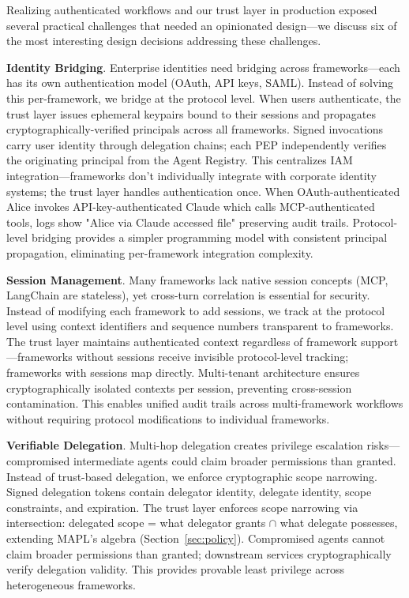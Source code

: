 Realizing authenticated workflows and our trust layer in production exposed several practical challenges that needed an opinionated design—we discuss six of the most interesting design decisions addressing these challenges.

\textbf{Identity Bridging}. Enterprise identities need bridging across frameworks—each has its own authentication model (OAuth, API keys, SAML). Instead of solving this per-framework, we bridge at the protocol level. When users authenticate, the trust layer issues ephemeral keypairs bound to their sessions and propagates cryptographically-verified principals across all frameworks. Signed invocations carry user identity through delegation chains; each PEP independently verifies the originating principal from the Agent Registry. This centralizes IAM integration—frameworks don't individually integrate with corporate identity systems; the trust layer handles authentication once. When OAuth-authenticated Alice invokes API-key-authenticated Claude which calls MCP-authenticated tools, logs show "Alice via Claude accessed file" preserving audit trails. Protocol-level bridging provides a simpler programming model with consistent principal propagation, eliminating per-framework integration complexity.

\textbf{Session Management}. Many frameworks lack native session concepts (MCP, LangChain are stateless), yet cross-turn correlation is essential for security. Instead of modifying each framework to add sessions, we track at the protocol level using context identifiers and sequence numbers transparent to frameworks. The trust layer maintains authenticated context regardless of framework support—frameworks without sessions receive invisible protocol-level tracking; frameworks with sessions map directly. Multi-tenant architecture ensures cryptographically isolated contexts per session, preventing cross-session contamination. This enables unified audit trails across multi-framework workflows without requiring protocol modifications to individual frameworks.

\textbf{Verifiable Delegation}. Multi-hop delegation creates privilege escalation risks—compromised intermediate agents could claim broader permissions than granted. Instead of trust-based delegation, we enforce cryptographic scope narrowing. Signed delegation tokens contain delegator identity, delegate identity, scope constraints, and expiration. The trust layer enforces scope narrowing via intersection: delegated scope = what delegator grants $\cap$ what delegate possesses, extending MAPL's algebra (Section~\ref{sec:policy}). Compromised agents cannot claim broader permissions than granted; downstream services cryptographically verify delegation validity. This provides provable least privilege across heterogeneous frameworks.

